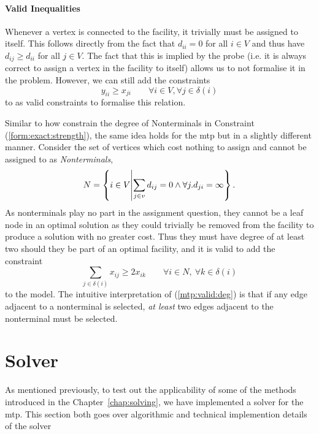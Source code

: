  \paragraph{Valid Inequalities}
 Whenever a vertex is connected to the facility, it trivially must be assigned to itself. This
 follows directly from the fact that $d_{ii} = 0$ for all $i \in V$ and thus have $d_{ij} \geq d_{ii}$
 for all $j \in V$. The fact that this is implied by the probe (i.e. it is always correct to assign a
 vertex in the facility to itself) allows us to not formalise it in the problem. However, we can
 still add the constraints
 \begin{equation}\label{form:mtp:str}
 y_{ii} \geq x_{ji} \qquad \forall i \in V,  \forall j \in \delta(i)
\end{equation}
 to as valid constraints to formalise this relation.

 Similar to how \citeauthor{ljubic2005solving} constrain the degree of Nonterminals in Constraint
 (\ref{form:exact:strength}), the same idea holds for the \gls{mtp} but in a slightly different manner.
 Consider the set of vertices which cost nothing to assign and cannot be assigned to as \textit{Nonterminals},
 $$N = \left\{ i \in V \middle\vert \sum_{j \in v} d_{ij} = 0 \wedge  \forall j. d_{ji} = \infty\right\}\mathnormal{.}$$
 As nonterminals play no part in the assignment question, they cannot be a leaf node in an optimal solution as they could trivially
 be removed from the facility to produce a solution with no greater cost. Thus they
 must have degree of at least
 two should they be part of an optimal facility, and it is valid to add the constraint
 \begin{equation}\label{mtp:valid:deg}
   \sum_{j \in \delta(i)}x_{ij} \geq 2 x_{ik} \qquad \forall i \in N, \: \forall k \in \delta(i)
 \end{equation}
 to the model. The intuitive interpretation of (\ref{mtp:valid:deg}) is that if any edge adjacent to
 a nonterminal is selected, \textit{at least} two edges adjacent to the nonterminal must be selected.
\section{Solver}\label{sec:mtp:solver}
As mentioned previously, to test out the applicability of some of the methods introduced in
the Chapter~\ref{chap:solving}, we have implemented a solver for the \gls{mtp}.
This section both goes over algorithmic and technical implemention details of the solver

